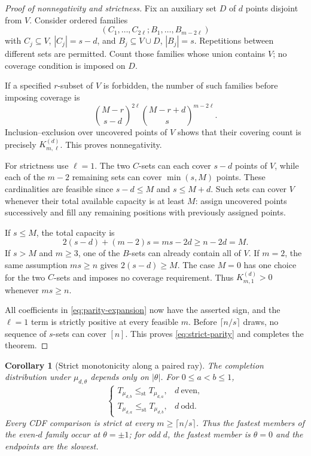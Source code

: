 \documentclass[11pt]{article}
\numberwithin{equation}{section}
\newtheorem{corollary}[theorem]{Corollary}
\theoremstyle{remark}
\newcommand{\1}{\mathbf 1}
\newcommand{\st}{\leq_{\mathrm{st}}}
\begin{document}
\begin{proof}[Proof of nonnegativity and strictness]
Fix an auxiliary set $D$ of $d$ points disjoint from $V$. Consider ordered families
\[
 (C_1,\ldots,C_{2\ell};B_1,\ldots,B_{m-2\ell})
\]
with $C_j\subseteq V$, $|C_j|=s-d$, and $B_j\subseteq V\cup D$, $|B_j|=s$. Repetitions between different sets are permitted. Count those families whose union contains $V$; no coverage condition is imposed on $D$.

If a specified $r$-subset of $V$ is forbidden, the number of such families before imposing coverage is
\[
 \binom{M-r}{s-d}^{2\ell}\binom{M-r+d}{s}^{m-2\ell}.
\]
Inclusion--exclusion over uncovered points of $V$ shows that their covering count is precisely $K^{(d)}_{m,\ell}$. This proves nonnegativity.

For strictness use $\ell=1$. The two $C$-sets can each cover $s-d$ points of $V$, while each of the $m-2$ remaining sets can cover $\min(s,M)$ points. These cardinalities are feasible since $s-d\leq M$ and $s\leq M+d$. Such sets can cover $V$ whenever their total available capacity is at least $M$: assign uncovered points successively and fill any remaining positions with previously assigned points.

If $s\leq M$, the total capacity is
\[
 2(s-d)+(m-2)s=ms-2d\geq n-2d=M.
\]
If $s>M$ and $m\geq3$, one of the $B$-sets can already contain all of $V$. If $m=2$, the same assumption $ms\geq n$ gives $2(s-d)\geq M$. The case $M=0$ has one choice for the two $C$-sets and imposes no coverage requirement. Thus $K^{(d)}_{m,1}>0$ whenever $ms\geq n$.

All coefficients in \eqref{eq:parity-expansion} now have the asserted sign, and the $\ell=1$ term is strictly positive at every feasible $m$. Before $\lceil n/s\rceil$ draws, no sequence of $s$-sets can cover $[n]$. This proves \eqref{eq:strict-parity} and completes the theorem.
\end{proof}

\begin{corollary}[Strict monotonicity along a paired ray]\label{cor:ray}
The completion distribution under $\mu_{d,\theta}$ depends only on $|\theta|$. For $0\leq a<b\leq1$,
\[
 \begin{cases}
 T_{\mu_{d,b}}\st T_{\mu_{d,a}},&d\ \text{even},\\
 T_{\mu_{d,a}}\st T_{\mu_{d,b}},&d\ \text{odd}.
 \end{cases}
\]
Every CDF comparison is strict at every $m\geq\lceil n/s\rceil$. Thus the fastest members of the even-$d$ family occur at $\theta=\pm1$; for odd $d$, the fastest member is $\theta=0$ and the endpoints are the slowest.
\end{corollary}
\end{document}
